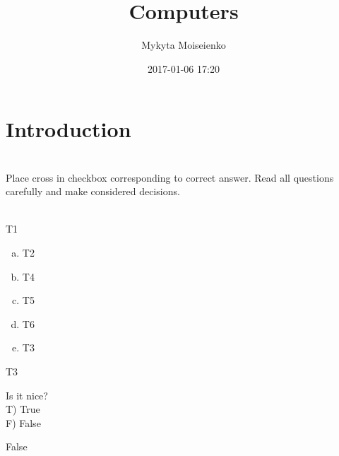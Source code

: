 \documentclass{report}
\begin{document}
\title{
Computers}

\date{
2017-01-06 17:20}
\vfill
\author{
Mykyta Moiseienko}
\maketitle
\clearpage

\chapter{Introduction}



\chapter{}
Place cross in checkbox corresponding to correct answer. Read all questions carefully and make considered decisions.\\\\

\begin{question}[type=exam]
T1
\begin{enumerate}[a)]
\item T2
\item T4
\item T5
\item T6
\item T3
\end{enumerate}
\end{question}
\begin{solution}
T3
\end{solution}

\begin{question}[type=exam]
Is it nice?\\
T) True\\ 
F) False
\end{question}
\begin{solution}
False
\end{solution}
\end{document}
